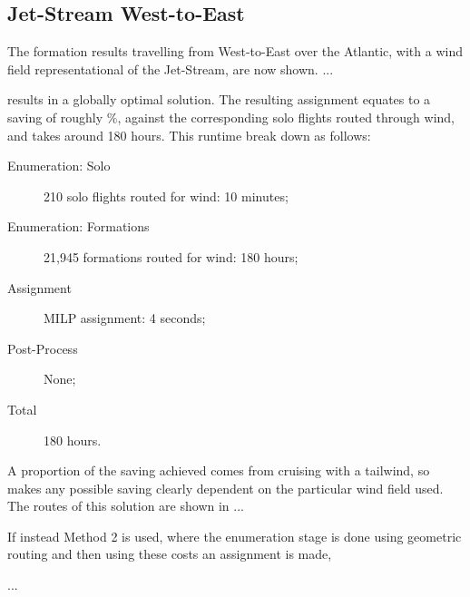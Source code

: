 		


		 \subsection{Jet-Stream West-to-East}\label{sec:WE}
		 	The formation results travelling from West-to-East over the Atlantic, with a wind field representational of the Jet-Stream, are now shown. 
		 	...

		 	results in a globally optimal solution. The resulting assignment equates to a saving of roughly \ValWindpcWE$\%$, against the corresponding solo flights routed through wind, and takes around 180 hours. This runtime break down as follows:
			\begin{samepage}
		 	\begin{description}
			 	\item[Enumeration: Solo] 210 solo flights routed for wind: 10 minutes;
			 	\item[Enumeration: Formations] 21,945 formations routed for wind: 180 hours; 
			 	\item[Assignment] MILP assignment: 4 seconds; 
			 	\item[Post-Process] None;
			 	\item[Total] 180 hours.
		 	\end{description}
		 	\end{samepage}

	 	 	A proportion of the saving achieved comes from cruising with a tailwind, so makes any possible saving clearly dependent on the particular wind field used. The routes of this solution are shown in ...

		 	If instead Method 2 is used, where the enumeration stage is done using geometric routing and then using these costs an assignment is made,  

		 	... 

